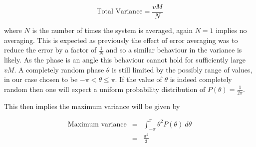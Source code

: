 \documentclass[aps,pra,twocolumn,superscriptaddress,numerical]{revtex4-1}
\begin{document}
			\begin{equation}
				\textrm{Total Variance}=\frac{vM}{N}\label{eq:Tot Var w/ correction}
			\end{equation}
			
			
			where $N$ is the number of times the system is averaged, again $N=1$ implies no averaging. This is expected as previously the effect of error averaging was to reduce the error by a factor of $\frac{1}{N}$ and so a similar behaviour in the variance is likely. As the phase is an angle this behaviour cannot hold for sufficiently large $vM$. A completely random phase $\theta$ is still limited by the possibly range of values, in our case chosen to be $-\pi<\theta\le\pi$. If the value of $\theta$ is indeed completely random then one will expect a uniform probability distribution of $P\left(\theta\right)=\frac{1}{2\pi}$. 
						
			This then implies the maximum variance will be given by
			
			\begin{eqnarray}
				\textrm{Maximum variance} & = & \int_{-\pi}^{\pi}\theta^{2}P\left(\theta\right)\ d\theta\nonumber \\
				& = & \frac{\pi^{2}}{3}\label{eq:Max Var}
			\end{eqnarray}
			
\end{document}

